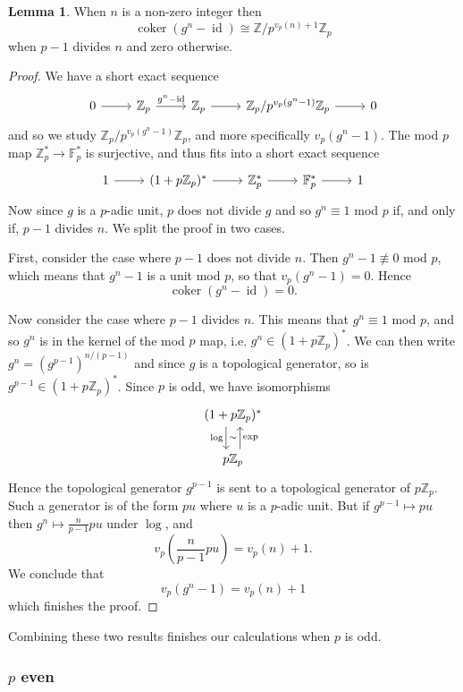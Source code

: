 \documentclass[a4paper]{article} %
\theoremstyle{definition}
\newtheorem{lemma}[theorem]{Lemma}
\newcommand{\Z}{\mathbb{Z}}
\newcommand{\F}{\mathbb{F}}
\DeclareMathOperator{\id}{id}           %
\DeclareMathOperator{\coker}{coker}     %
\begin{document}
\begin{lemma}
  When $n$ is a non-zero  integer then
  \[
    \coker(g^n - \id) \cong \Z/p^{v_p(n)+1}\Z_p
  \]
  when $p-1$ divides $n$ and zero otherwise.
\end{lemma}
\begin{proof}
We have a short exact sequence 
\[
\begin{tikzcd}
0 \rar & \Z_p \rar{g^n - \operatorname{id}} & \Z_p \rar{} & \Z_p/{p^{v_p(g^n-1)}\Z_p} \rar & 0
\end{tikzcd}
\]
and so we study $\Z_p/{p^{v_p(g^n-1)}\Z_p}$, and more specifically $v_p(g^n-1)$. The mod $p$ map $\Z_p^* \to \F_p^*$ is surjective, and thus fits into a short exact sequence
\[
\begin{tikzcd}
1 \rar & (1+p\Z_p)^* \rar{} & \Z_p^* \rar{} & \F_p^* \rar & 1
\end{tikzcd}
\]
Now since $g$ is a $p$-adic unit, $p$ does not divide $g$ and so $g^n \equiv 1$ mod $p$ if, and only if, $p-1$ divides $n$. We split the proof in two cases.

First, consider the case where $p-1$ does not divide $n$. Then $g^n -1 \not\equiv 0$ mod $p$, which means that $g^n -1$ is a unit mod $p$, so that $v_p(g^n - 1) = 0$. Hence
\[
\coker ( g^n - \id ) = 0.
\]

Now consider the case where $p-1$ divides $n$. This means that $g^n \equiv 1$ mod $p$, and so $g^n$ is in the kernel of the mod $p$ map, i.e. $g^n \in (1 + p\Z_p)^*$. We can then write $g^n = (g^{p-1})^{n/(p-1)}$ and since $g$ is a topological generator, so is $g^{p-1} \in (1 + p\Z_p)^*$. Since $p$ is odd, we have isomorphisms
\[
\begin{tikzcd}
  (1+ p\Z_p)^* \arrow[d, "\log"', "\sim", shift right=1.3ex] \\
  p\Z_p \arrow[u, "\exp"', shift right = 1.3ex]{exp}
\end{tikzcd}
\]
Hence the topological generator $g^{p-1}$ is sent to a topological generator of $p\Z_p$. Such a generator is of the form $pu$ where $u$ is a $p$-adic unit. But if $g^{p-1} \mapsto pu$ then $g^n \mapsto \frac{n}{p-1}pu$ under $\log$, and $$v_p\left(\frac{n}{p-1}pu\right) = v_p(n)+1.$$ We conclude that
\[
v_p(g^n - 1 ) = v_p(n) + 1
\]
which finishes the proof.
\end{proof}
Combining these two results finishes our calculations when $p$ is odd.

\subsubsection{$p$ even}
\end{document}
